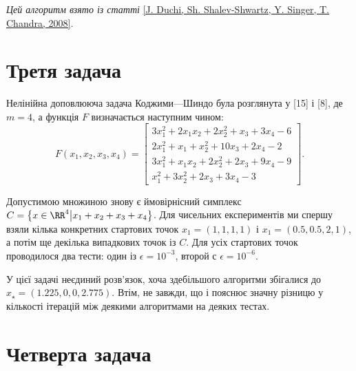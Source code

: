 \emph{Цей алгоритм взято із статті} \href{https://stanford.edu/~jduchi/projects/DuchiShSiCh08.pdf}{[J. Duchi, Sh. Shalev-Shwartz, Y. Singer, T. Chandra, 2008]}.

\section{Третя задача}

Нелінійна доповлююча задача Коджими---Шиндо була розглянута у [15] і [8], де $m = 4$, а функція $F$ визначається наступним чином:
\begin{equation}
    F(x_1, x_2, x_3, x_4) = \begin{bmatrix}
        3 x_1^2 + 2 x_1 x_2 + 2 x_2^2 + x_3 + 3 x_4 - 6 \\
        2 x_1^2 + x_1 + x_2^2 + 10 x_3 + 2 x_4 - 2 \\
        3 x_1^2 + x_1 x_2 + 2 x_2^2 + 2 x_3 + 9 x_4 - 9 \\
        x_1^2 + 3 x_2^2 + 2 x_3 + 3 x_4 - 3
    \end{bmatrix}.
\end{equation}

Допустимою множиною знову є ймовірнісний симплекс $C = \left\{ x \in \RR^4 \middle| x_1 + x_2 + x_3 + x_4 \right\}$. Для чисельних експериментів ми спершу взяли кілька конкретних стартових точок $x_1 = (1, 1, 1, 1)$ і $x_1 = (0.5, 0.5, 2, 1)$, а потім ще декілька випадкових точок із $C$. Для усіх стартових точок проводилося два тести: один із $\epsilon = 10^{-3}$, второй с $\epsilon = 10^{-6}$.

\begin{remark}
    У цієї задачі неєдиний розв'язок, хоча здебільшого алгоритми збігалися до $x_\star = (1.225, 0, 0, 2.775)$. Втім, не завжди, що і пояснює значну різницю у кількості ітерацій між деякими алгоритмами на деяких тестах.
\end{remark}

\section{Четверта задача}

